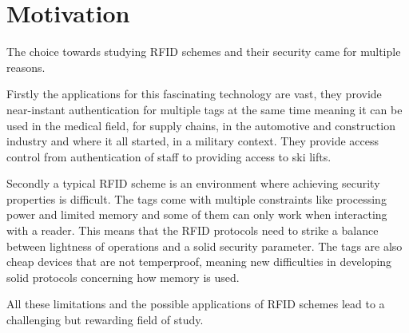 \chapter*{Motivation} 

The choice towards studying RFID schemes and their security came for multiple reasons. 

Firstly the applications for this fascinating technology are vast, they provide near-instant authentication for multiple tags 
at the same time meaning it can be used in the medical field, for supply chains, in the automotive and construction industry and where 
it all started, in a military context. They provide access control from authentication of staff to providing access to ski lifts.

Secondly a typical RFID scheme is an environment where achieving security properties is difficult. The tags come with multiple 
constraints like processing power and limited memory and some of them can only work when interacting with a reader. This means 
that the RFID protocols need to strike a balance between lightness of operations and a solid security parameter. 
The tags are also cheap devices that are not temperproof, meaning new difficulties in developing solid protocols concerning how
memory is used.

All these limitations and the possible applications of RFID schemes lead to a challenging but rewarding 
field of study.